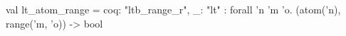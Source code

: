 val lt_atom_range = {coq: "ltb_range_r", _: "lt"}     : forall 'n 'm 'o. (atom('n), range('m, 'o)) -> bool
